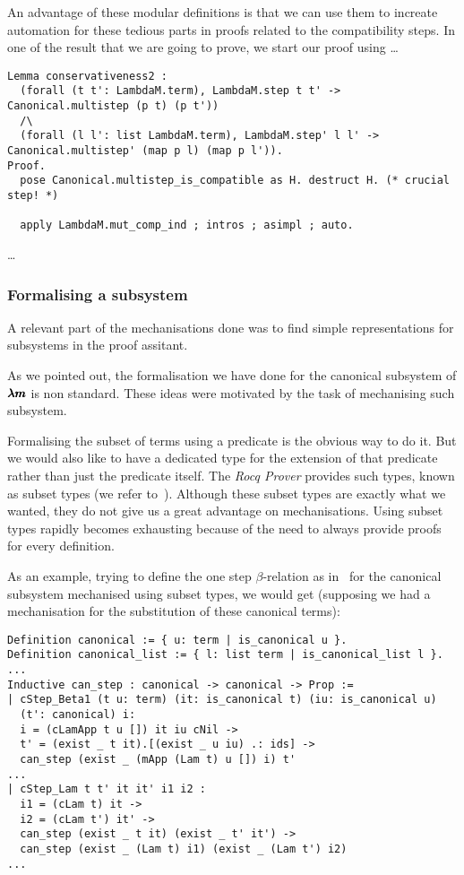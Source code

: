 An advantage of these modular definitions is that we can use them to increate automation for these tedious parts in proofs related to the compatibility steps.
In one of the result that we are going to prove, we start our proof using \dots

\begin{lstlisting}[language=Coq]
Lemma conservativeness2 :
  (forall (t t': LambdaM.term), LambdaM.step t t' -> Canonical.multistep (p t) (p t'))
  /\
  (forall (l l': list LambdaM.term), LambdaM.step' l l' -> Canonical.multistep' (map p l) (map p l')).
Proof.
  pose Canonical.multistep_is_compatible as H. destruct H. (* crucial step! *) 

  apply LambdaM.mut_comp_ind ; intros ; asimpl ; auto.
\end{lstlisting}

\dots


\subsubsection{Formalising a subsystem}

A relevant part of the mechanisations done was to find simple representations for subsystems in the proof assitant.

As we pointed out, the formalisation we have done for the canonical subsystem of $\pmb{\lambda m}$ is non standard.
These ideas were motivated by the task of mechanising such subsystem.

Formalising the subset of terms using a predicate is the obvious way to do it.
But we would also like to have a dedicated type for the extension of that predicate rather than just the predicate itself.
The \textit{Rocq Prover} provides such types, known as subset types (we refer to~\cite[Chapter~9.1]{CoqArt}).
Although these subset types are exactly what we wanted, they do not give us a great advantage on mechanisations.
Using subset types rapidly becomes exhausting because of the need to always provide proofs for every definition.

As an example, trying to define the one step $\beta$-relation as in~\cite[Chapter~3.1]{JCES2002} for the canonical subsystem mechanised using subset types, we would get (supposing we had a mechanisation for the substitution of these canonical terms):
\begin{lstlisting}[language=Coq]
Definition canonical := { u: term | is_canonical u }. 
Definition canonical_list := { l: list term | is_canonical_list l }.
...
Inductive can_step : canonical -> canonical -> Prop :=
| cStep_Beta1 (t u: term) (it: is_canonical t) (iu: is_canonical u)
  (t': canonical) i:
  i = (cLamApp t u []) it iu cNil ->
  t' = (exist _ t it).[(exist _ u iu) .: ids] ->
  can_step (exist _ (mApp (Lam t) u []) i) t'
...
| cStep_Lam t t' it it' i1 i2 :
  i1 = (cLam t) it ->
  i2 = (cLam t') it' ->
  can_step (exist _ t it) (exist _ t' it') ->
  can_step (exist _ (Lam t) i1) (exist _ (Lam t') i2)
...
\end{lstlisting}

